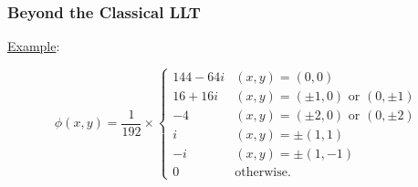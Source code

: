 \documentclass{beamer}
\theoremstyle{definition}
\begin{document}
\begin{frame}
\frametitle{Beyond the Classical LLT}



\underline{Example}:

\begin{equation*}
\phi(x,y) =
\frac{1}{192}\times
\begin{cases}
144 - 64i &(x,y) = (0,0)\\
16 + 16i &(x,y) = (\pm 1, 0)\mbox{ or }(0,\pm 1)\\
-4        &(x,y) = (\pm 2,0)\mbox{ or }(0,\pm 2)\\
i   &(x,y) = \pm(1,1)\\
-i   &(x,y) = \pm(1,-1)\\
0& \text{otherwise}.
\end{cases}
\end{equation*}

\end{frame}
\end{document}
